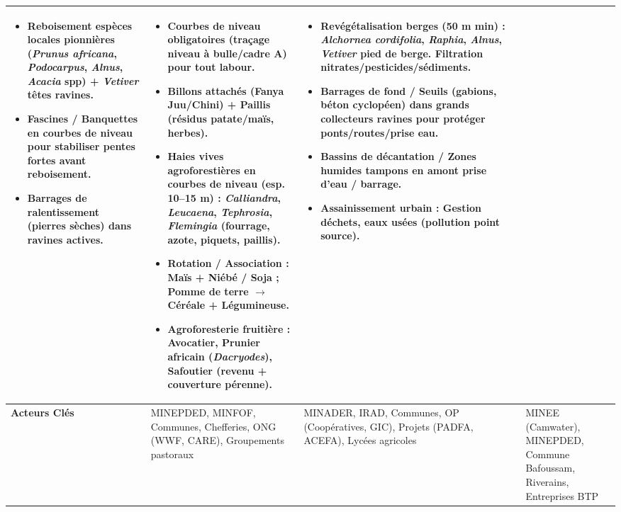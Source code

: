 \documentclass[11pt]{article}
\begin{document}
\begin{exoresolu}
\begin{center}
\begin{tabularx}{\linewidth}{|l|X|X|X|}
\begin{itemize}
        \item \textbf{Reboisement} espèces locales pionnières (\emph{Prunus africana}, \emph{Podocarpus}, \emph{Alnus}, \emph{Acacia} spp) + \emph{Vetiver} têtes ravines.
        \item \textbf{Fascines / Banquettes} en courbes de niveau pour stabiliser pentes fortes avant reboisement.
        \item \textbf{Barrages de ralentissement} (pierres sèches) dans ravines actives.
    \end{itemize} &
    \begin{itemize}
        \item \textbf{Courbes de niveau obligatoires} (traçage niveau à bulle/cadre A) pour tout labour.
        \item \textbf{Billons attachés (Fanya Juu/Chini)} + \textbf{Paillis} (résidus patate/maïs, herbes).
        \item \textbf{Haies vives agroforestières} en courbes de niveau (esp. 10–15 m) : \emph{Calliandra}, \emph{Leucaena}, \emph{Tephrosia}, \emph{Flemingia} (fourrage, azote, piquets, paillis).
        \item \textbf{Rotation / Association} : Maïs + Niébé / Soja ; Pomme de terre $\rightarrow$ Céréale + Légumineuse.
        \item \textbf{Agroforesterie fruitière} : Avocatier, Prunier africain (\emph{Dacryodes}), Safoutier (revenu + couverture pérenne).
    \end{itemize} &
    \begin{itemize}
        \item \textbf{Revégétalisation berges (50 m min)} : \emph{Alchornea cordifolia}, \emph{Raphia}, \emph{Alnus}, \emph{Vetiver} pied de berge. Filtration nitrates/pesticides/sédiments.
        \item \textbf{Barrages de fond / Seuils} (gabions, béton cyclopéen) dans grands collecteurs ravines pour protéger ponts/routes/prise eau.
        \item \textbf{Bassins de décantation / Zones humides tampons} en amont prise d'eau / barrage.
        \item \textbf{Assainissement urbain} : Gestion déchets, eaux usées (pollution point source).
    \end{itemize} \\ \hline
    \textbf{Acteurs Clés} & MINEPDED, MINFOF, Communes, Chefferies, ONG (WWF, CARE), Groupements pastoraux & MINADER, IRAD, Communes, OP (Coopératives, GIC), Projets (PADFA, ACEFA), Lycées agricoles & MINEE (Camwater), MINEPDED, Commune Bafoussam, Riverains, Entreprises BTP \\ \hline

\end{tabularx}
\end{center}
\end{exoresolu}
\end{document}
